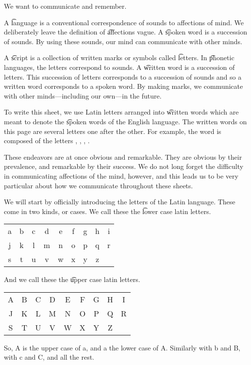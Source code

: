 

We want to communicate and remember.


A \t{language} is a conventional correspondence of sounds to affections of mind.
We deliberately leave the definition of \t{affections} vague.
A \t{spoken word} is a succession of sounds.
By using these sounds, our mind can communicate with other minds.

A \t{script} is a collection of written marks or symbols called \t{letters}.
In \t{phonetic} languages, the letters correspond to sounds.
A \t{written word} is a succession of letters.
This succession of letters corresponds to a succession of sounds and so a written word corresponds to a spoken word.
By making marks, we communicate with other minds---including our own---in the future.

To write this sheet, we use Latin letters arranged into \t{written words} which are meant to denote the \t{spoken words} of the English language.
The written words on this page are several letters one after the other.
For example, the word  is composed of the letters , , , .

These endeavors are at once obvious and remarkable.
They are obvious by their prevalence, and remarkable by their success.
We do not long forget the difficulty in communicating affections of the mind, however, and this leads us to be very particular about how we communicate throughout these sheets.


We will start by officially introducing the letters of the Latin language.
These come in two kinds, or cases.
We call these the \t{lower case latin letters}.
\begin{center}
\begin{tabular}{ccccccccc}
  a & b & c & d & e & f & g & h & i \\
  j & k & l & m & n & o & p & q & r \\
  s & t & u & v & w & x & y & z &   \\
\end{tabular}
\end{center}
And we call these the \t{upper case latin letters}.
\begin{center}
\begin{tabular}{ccccccccc}
  A & B & C & D & E & F & G & H & I \\
  J & K & L & M & N & O & P & Q & R \\
  S & T & U & V & W & X & Y & Z &   \\
\end{tabular}
\end{center}
So, A is the upper case of a, and a the lower case of A.
Similarly with b and B, with c and C, and all the rest.

